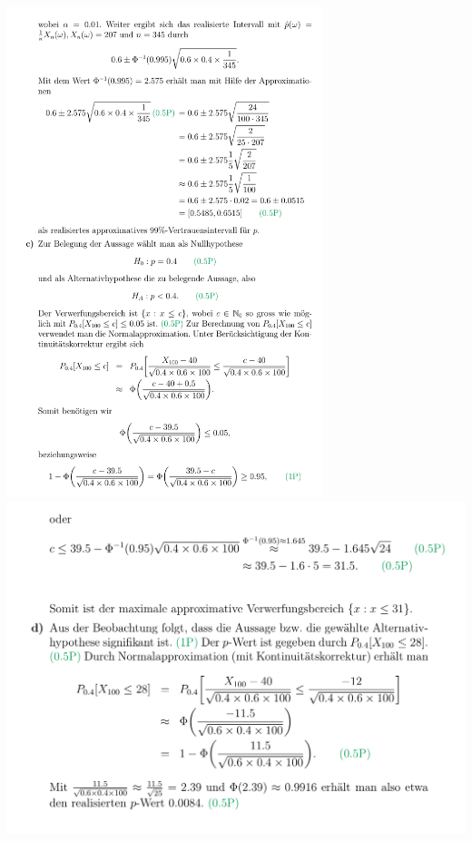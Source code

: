 \includegraphics[height=143mm]{old_exams_prtsrc/sch_infk_so19_ml-10.png}\newline
\includegraphics[width=0.7\linewidth]{old_exams_prtsrc/sch_infk_so19_ml-11.png}\newline

